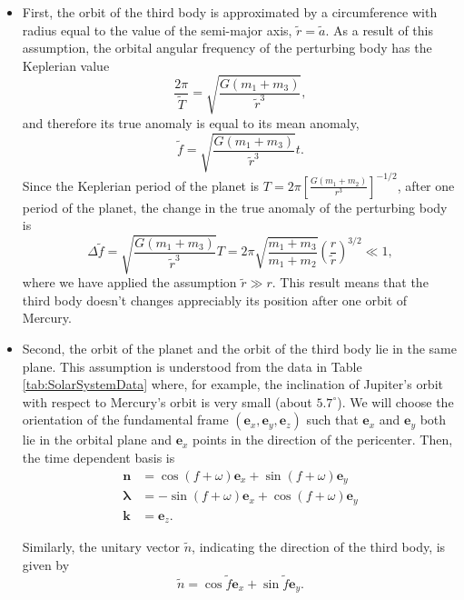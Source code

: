 \begin{itemize}
\item First, the orbit of the third body is approximated by a circumference with radius equal to the value of the semi-major axis, $\tilde{r} = \tilde{a}$. As a result of this assumption, the orbital angular frequency of the perturbing body has the Keplerian value
\begin{equation}
\frac{2\pi}{\tilde{T}} = \sqrt{\frac{G(m_1 + m_3)}{\tilde{r}^3}},
\end{equation}
and therefore its true anomaly is equal to its mean anomaly,
\begin{equation}
\tilde{f} = \sqrt{\frac{G(m_1 + m_3)}{\tilde{r}^3}} t.
\end{equation}
Since the Keplerian period of the planet is
$T = 2\pi \left[ \frac{G(m_1 + m_2)}{r^3} \right]^{-1/2}$, after one period of the planet, the change in the true anomaly of the perturbing body is
\begin{equation}
\Delta \tilde{f} = \sqrt{\frac{G(m_1 + m_3)}{\tilde{r}^3}} T = 2\pi \sqrt{ \frac{m_1 + m_3}{m_1 + m_2}} \left( \frac{r}{\tilde{r}} \right)^{3/2} \ll 1,\label{eq:periodApprox}
\end{equation}
where we have applied the assumption $\tilde{r} \gg r$. This result means that the third body doesn't changes appreciably its position after one orbit of Mercury. 

\item Second, the orbit of the planet and the orbit of the third body lie in the same plane. This assumption is understood  from the data in Table \ref{tab:SolarSystemData} where, for example, the inclination of Jupiter's orbit with respect to Mercury's orbit is very small (about $5.7 ^\circ$). We will choose the orientation of the fundamental frame $(\textbf{e}_x, \textbf{e}_y, \textbf{e}_z)$ such that $\textbf{e}_x$ and $\textbf{e}_y$ both lie in the orbital plane and $\textbf{e}_x$ points in the direction of the pericenter. Then, the time dependent basis is
\begin{subequations}
\begin{align}
\textbf{n} &= \cos (f + \omega) \textbf{e}_x + \sin (f + \omega) \textbf{e}_y \\
\boldsymbol{\lambda} &= -\sin (f + \omega) \textbf{e}_x + \cos (f + \omega) \textbf{e}_y \\
\textbf{k} &= \textbf{e}_z.
\end{align}
\end{subequations}

Similarly, the unitary vector $\tilde{n}$, indicating the direction of the third body, is given by
\begin{equation}
\tilde{n} = \cos \tilde{f} \textbf{e}_x + \sin \tilde{f} \textbf{e}_y.	
\end{equation}
\end{itemize}

